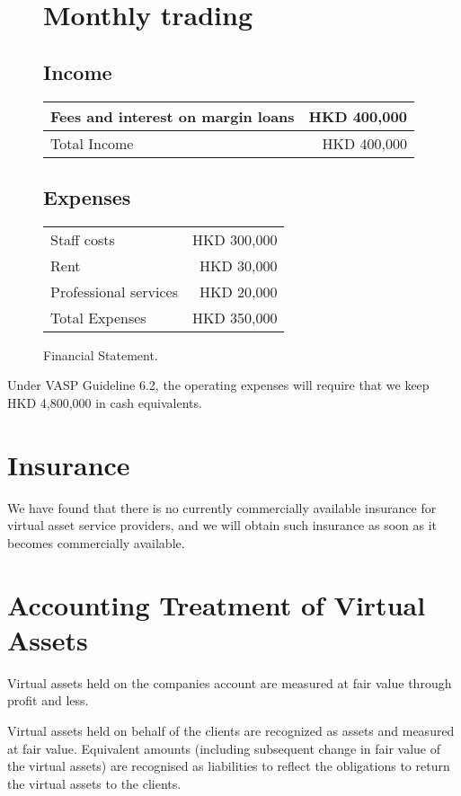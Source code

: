 \begin{figure}[h]
  \centering
  \caption{Financial Statement.}
  \label{fig:financial_statement}
  
  \section*{Monthly trading }
  
  \subsection*{Income}
  \begin{tabular}{lr}
    Fees and interest on margin loans & HKD 400,000 \\
    \midrule
    Total Income & HKD 400,000 \\
  \end{tabular}
  
  \subsection*{Expenses}
  \begin{tabular}{lr}
    Staff costs & HKD 300,000 \\
    Rent & HKD 30,000 \\
    Professional services & HKD 20,000 \\
    \midrule
    Total Expenses & HKD 350,000 \\
  \end{tabular}
\end{figure}

Under VASP Guideline 6.2, the operating expenses will require that we keep
HKD 4,800,000 in cash equivalents.

\section{Insurance}
We have found that there is no currently commercially available
insurance for virtual asset service providers, and we will obtain such
insurance as soon as it becomes commercially available.

\section{Accounting Treatment of Virtual Assets}
Virtual assets held on the companies account are measured at fair
value through profit and less.

Virtual assets held on behalf of the clients are recognized as assets
and measured at fair value.  Equivalent amounts (including subsequent
change in fair value of the virtual assets) are recognised as
liabilities to reflect the obligations to return the virtual assets to
the clients.

